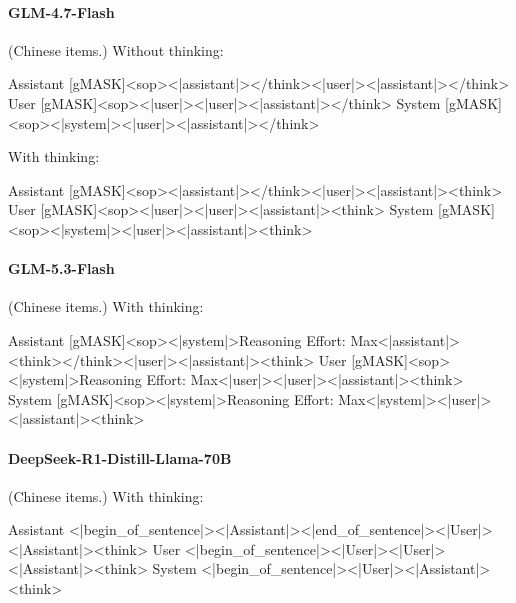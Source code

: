 \paragraph{GLM-4.7-Flash} (Chinese items.)
\noindent Without thinking:
\begin{Rendering}
Assistant  [gMASK]<sop><|assistant|></think><|user|><|assistant|></think>
User       [gMASK]<sop><|user|><|user|><|assistant|></think>
System     [gMASK]<sop><|system|><|user|><|assistant|></think>
\end{Rendering}
\noindent With thinking:
\begin{Rendering}
Assistant  [gMASK]<sop><|assistant|></think><|user|><|assistant|><think>
User       [gMASK]<sop><|user|><|user|><|assistant|><think>
System     [gMASK]<sop><|system|><|user|><|assistant|><think>
\end{Rendering}
\paragraph{GLM-5.3-Flash} (Chinese items.)
\noindent With thinking:
\begin{Rendering}
Assistant  [gMASK]<sop><|system|>Reasoning Effort: Max<|assistant|><think></think><|user|><|assistant|><think>
User       [gMASK]<sop><|system|>Reasoning Effort: Max<|user|><|user|><|assistant|><think>
System     [gMASK]<sop><|system|>Reasoning Effort: Max<|system|><|user|><|assistant|><think>
\end{Rendering}
\paragraph{DeepSeek-R1-Distill-Llama-70B} (Chinese items.)
\noindent With thinking:
\begin{Rendering}
Assistant  <|begin_of_sentence|><|Assistant|><|end_of_sentence|><|User|><|Assistant|><think>\NL{}
User       <|begin_of_sentence|><|User|><|User|><|Assistant|><think>\NL{}
System     <|begin_of_sentence|><|User|><|Assistant|><think>\NL{}
\end{Rendering}
